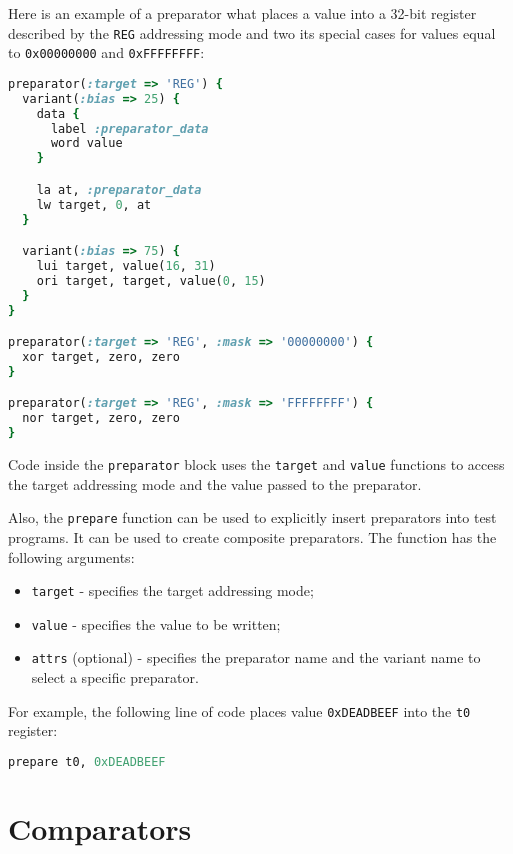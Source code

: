 \documentclass[oneside,final,12pt]{extreport}
\begin{document}
Here is an example of a preparator what places a value into a 32-bit register described by
the {\tt REG} addressing mode and two its special cases for values equal to {\tt 0x00000000}
and {\tt 0xFFFFFFFF}:

\begin{lstlisting}[language=ruby, emph={preparator, variant, data}]
preparator(:target => 'REG') {
  variant(:bias => 25) {
    data {
      label :preparator_data
      word value
    }

    la at, :preparator_data
    lw target, 0, at
  }

  variant(:bias => 75) {
    lui target, value(16, 31)
    ori target, target, value(0, 15)
  }
}

preparator(:target => 'REG', :mask => '00000000') {
  xor target, zero, zero
}

preparator(:target => 'REG', :mask => 'FFFFFFFF') {
  nor target, zero, zero
}
\end{lstlisting}

Code inside the {\tt preparator} block uses the {\tt target} and {\tt value} functions to
access the target addressing mode and the value passed to the preparator.

Also, the {\tt prepare} function can be used to explicitly insert preparators into test programs.
It can be used to create composite preparators. The function has the following arguments:

\begin{itemize}
\item {\tt target} - specifies the target addressing mode;
\item {\tt value} - specifies the value to be written;
\item {\tt attrs} (optional) - specifies the preparator name and the variant name to select
      a specific preparator.
\end{itemize}

For example, the following line of code places value {\tt 0xDEADBEEF} into the {\tt t0} register:

\begin{lstlisting}[language=ruby, emph={prepare}]
prepare t0, 0xDEADBEEF
\end{lstlisting}


\section{Comparators}
\end{document}
